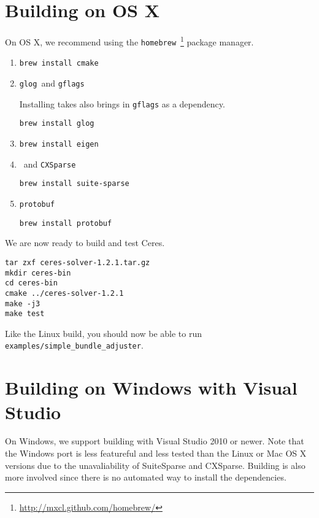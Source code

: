 \section{Building on OS X}
On OS X, we recommend using the \texttt{homebrew}~\footnote{\url{http://mxcl.github.com/homebrew/}} package manager.

\begin{enumerate}
\item{\cmake}
\begin{verbatim}
brew install cmake
\end{verbatim}
\item{\texttt{glog}\ and \texttt{gflags}}

Installing \texttt{\glog} takes also brings in \texttt{gflags} as a dependency.
\begin{verbatim}
brew install glog
\end{verbatim}
\item{\eigen}
\begin{verbatim}
brew install eigen
\end{verbatim}
\item{\suitesparse\ and \texttt{CXSparse}}
\begin{verbatim}
brew install suite-sparse
\end{verbatim}
\item{\texttt{protobuf}}
\begin{verbatim}
brew install protobuf
\end{verbatim}
\end{enumerate}

We are now ready to build and test Ceres.
\begin{verbatim}
tar zxf ceres-solver-1.2.1.tar.gz
mkdir ceres-bin
cd ceres-bin
cmake ../ceres-solver-1.2.1
make -j3
make test
\end{verbatim}
Like the Linux build, you should now be able to run \texttt{examples/simple\_bundle\_adjuster}.


\section{Building on Windows with Visual Studio}
On Windows, we support building with Visual Studio 2010 or newer. Note that the
Windows port is less featureful and less tested than the Linux or Mac OS X
versions due to the unavaliability of SuiteSparse and CXSparse. Building is
also more involved since there is no automated way to install the dependencies.

